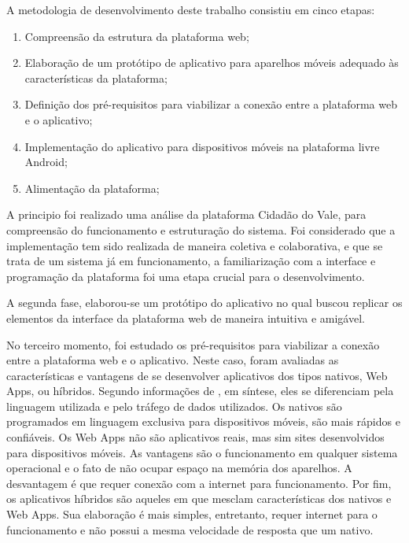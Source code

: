 \begin{flushleft}
	A metodologia de desenvolvimento deste trabalho consistiu em cinco etapas:
\end{flushleft}

\begin{enumerate}
		\item Compreensão da estrutura da plataforma web;
		\item Elaboração de um protótipo de aplicativo para aparelhos móveis adequado às características da plataforma;
		\item Definição dos pré-requisitos para viabilizar a conexão entre a plataforma web e o aplicativo;
		\item Implementação do aplicativo para dispositivos móveis na plataforma livre Android;
		\item Alimentação da plataforma;
\end{enumerate}

A principio foi realizado uma análise da plataforma Cidadão do Vale, para compreensão do funcionamento e estruturação do sistema. Foi considerado que a implementação tem sido realizada de maneira coletiva e colaborativa, e que se trata de um sistema já em funcionamento, a familiarização com a interface e programação da plataforma foi uma etapa crucial para o desenvolvimento.

A segunda fase, elaborou-se um protótipo do aplicativo no qual buscou replicar os elementos da interface da plataforma web de maneira intuitiva e amigável.

No terceiro momento, foi estudado os pré-requisitos para viabilizar a conexão entre a plataforma web e o aplicativo. Neste caso, foram avaliadas as características e vantagens de se desenvolver aplicativos dos tipos nativos, Web Apps, ou híbridos. Segundo informações de , em síntese, eles se diferenciam pela linguagem utilizada e pelo tráfego de dados utilizados. Os nativos são programados em linguagem exclusiva para dispositivos móveis, são mais rápidos e confiáveis. Os Web Apps não são aplicativos reais, mas sim sites desenvolvidos para dispositivos móveis. As vantagens são o funcionamento em qualquer sistema operacional e o fato de não ocupar espaço na memória dos aparelhos. A desvantagem é que requer conexão com a internet para funcionamento. Por fim, os aplicativos híbridos são aqueles em que mesclam características dos nativos e Web Apps. Sua elaboração é mais simples, entretanto, requer internet para o funcionamento e não possui a mesma velocidade de resposta que um nativo. 

